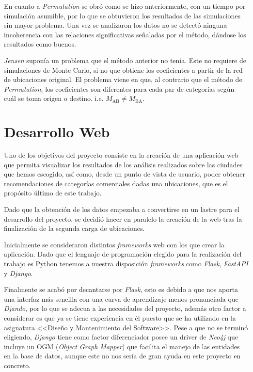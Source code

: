 En cuanto a \textit{Permutation} se obró como se hizo anteriormente, con un tiempo por simulación asumible, por lo que se obtuvieron los resultados de las simulaciones sin mayor problema. Una vez se analizaron los datos no se detectó ninguna incoherencia con las relaciones significativas señaladas por el método, dándose los resultados como buenos.

\textit{Jensen} suponía un problema que el método anterior no tenía. Este no requiere de simulaciones de Monte Carlo, si no que obtiene los coeficientes a partir de la red de ubicaciones original. El problema viene en que, al contrario que el método de \textit{Permutation}, los coeficientes son diferentes para cada par de categorías según cuál se toma origen o destino. i.e. $M_\text{AB} \neq M_\text{BA}$.



\section{Desarrollo Web}
Uno de los objetivos del proyecto consiste en la creación de una aplicación web que permita visualizar los resultados de los análisis realizados sobre las ciudades que hemos escogido, así como, desde un punto de vista de usuario, poder obtener recomendaciones de categorías comerciales dadas una ubicaciones, que es el propósito último de este trabajo.

Dado que la obtención de los datos empezaba a convertirse en un lastre para el desarrollo del proyecto, se decidió hacer en paralelo la creación de la web tras la finalización de la segunda carga de ubicaciones.

Inicialmente se consideraron distintos \textit{frameworks} web con los que crear la aplicación. Dado que el lenguaje de programación elegido para la realización del trabajo es Python tenemos a nuestra disposición \textit{frameworks} como \textit{Flask}, \textit{FastAPI} y \textit{Django}.

Finalmente se acabó por decantarse por \textit{Flask}, esto es debido a que nos aporta una interfaz más sencilla con una curva de aprendizaje menos pronunciada que \textit{Djando}, por lo que se adecua a las necesidades del proyecto, además otro factor a considerar es que ya se tiene experiencia en él puesto que se ha utilizado en la asignatura <<Diseño y Mantenimiento del Software>>. Pese a que no se terminó eligiendo, \textit{Django} tiene como factor diferenciador posee un driver de \textit{Neo4j} que incluye un OGM (\textit{Object Graph Mapper}) que facilita el manejo de las entidades en la base de datos, aunque este no nos sería de gran ayuda en este proyecto en concreto.


